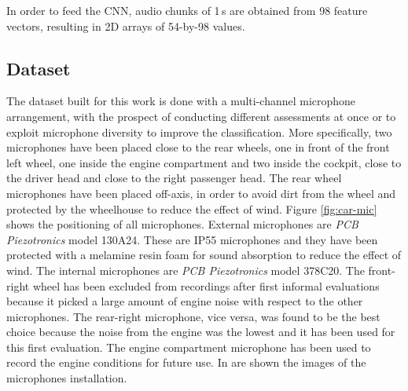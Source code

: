 In order to feed the CNN, audio chunks of 1\,s are obtained from 98 feature vectors, resulting in 2D arrays of 54-by-98 values.

\subsection{Dataset}

The dataset built for this work is done with a multi-channel microphone arrangement, with the prospect of conducting different assessments at once or to exploit microphone diversity to improve the classification. More specifically, two microphones have been placed close to the rear wheels, one in front of the front left wheel, one inside the engine compartment and two inside the cockpit, close to the driver head and close to the right passenger head. The rear wheel microphones have been placed off-axis, in order to avoid dirt from the wheel and protected by the wheelhouse to reduce the effect of wind. Figure \ref{fig:car-mic} shows the positioning of all microphones. External microphones are \textit{PCB Piezotronics} model 130A24. These are IP55 microphones and they have been protected with a melamine resin foam for sound absorption to reduce the effect of wind. The internal microphones are \textit{PCB Piezotronics} model 378C20. The front-right wheel has been excluded from recordings after first informal evaluations because it picked a large amount of engine noise with respect to the other microphones. The rear-right microphone, vice versa, was found to be the best choice because the noise from the engine was the lowest and it has been used for this first evaluation. The engine compartment microphone has been used to record the engine conditions for future use. In  are shown the images of the microphones installation. 

